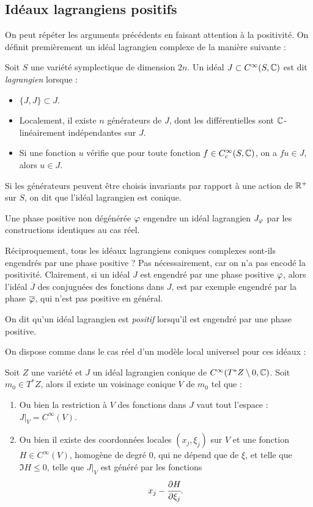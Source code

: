 \subsection{Idéaux lagrangiens positifs}
On peut répéter les arguments précédents en faisant attention à la positivité. On définit premièrement un idéal lagrangien complexe de la manière suivante :

\begin{defn}Soit $S$ une variété symplectique de dimension $2n$. Un idéal $J \subset C^{\infty}(S,\mathbb{C})$ est dit \emph{lagrangien} lorsque :
	\begin{itemize}
		\item $\{J,J\}\subset J$.
		\item Localement, il existe $n$ générateurs de $J$, dont les différentielles sont $\mathbb{C}$-linéairement indépendantes sur $J$.
		\item Si une fonction $u$ vérifie que pour toute fonction $f \in C^{\infty}_c(S,\mathbb{C})$, on a $fu \in J$, alors $u \in J$.
	\end{itemize}
	Si les générateurs peuvent être choisis invariants par rapport à une action de $\mathbb{R}^+$ sur $S$, on dit que l'idéal lagrangien est conique.
\end{defn}

Une phase positive non dégénérée $\varphi$ engendre un idéal lagrangien $J_{\varphi}$ par les constructions identiques au cas réel.

Réciproquement, tous les idéaux lagrangiens coniques complexes sont-ils engendrés par une phase positive ? Pas nécessairement, car on n'a pas encodé la positivité. Clairement, si un idéal $J$ est engendré par une phase positive $\varphi$, alors l'idéal $\overline{J}$ des conjuguées des fonctions dans $J$, est par exemple engendré par la phase $\overline{\varphi}$, qui n'est pas positive en général.
\begin{defn}
	On dit qu'un idéal lagrangien est \emph{positif} lorsqu'il est engendré par une phase positive.
\end{defn}

On dispose comme dans le cas réel d'un modèle local universel pour ces idéaux :
\begin{lem}
	Soit $Z$ une variété et $J$ un idéal lagrangien conique de $C^{\infty}(T^*Z \setminus 0,\mathbb{C})$. Soit $m_0\in T^*Z$, alors il existe un voisinage conique $V$ de $m_0$ tel que :
	\begin{enumerate}
		\item Ou bien la restriction à $V$ des fonctions dans $J$ vaut tout l'espace : $J|_V = C^{\infty}(V)$.
		\item Ou bien il existe des coordonnées locales $(x_j,\xi_j)$ sur $V$ et une fonction $H\in C^{\infty}(V)$, homogène de degré 0, qui ne dépend que de $\xi$, et telle que ${\Im H \leq 0}$, telle que $J|_{V}$ est généré par les fonctions
		\begin{equation*}
		x_j-\cfrac{\partial H}{\partial \xi_j}.
		\end{equation*}
	\end{enumerate} 
\end{lem}

